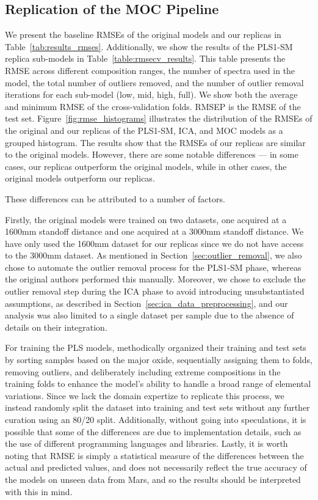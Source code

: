 \subsection{Replication of the MOC Pipeline}\label{sec:replica_moc}
We present the baseline RMSEs of the original models and our replicas in Table~\ref{tab:results_rmses}.
Additionally, we show the results of the PLS1-SM replica sub-models in Table~\ref{table:rmsecv_results}. This table presents the RMSE across different composition ranges, the number of spectra used in the model, the total number of outliers removed, and the number of outlier removal iterations for each sub-model (low, mid, high, full). We show both the average and minimum RMSE of the cross-validation folds. RMSEP is the RMSE of the test set.
Figure~\ref{fig:rmse_histograms} illustrates the distribution of the RMSEs of the original and our replicas of the PLS1-SM, ICA, and MOC models as a grouped histogram.
The results show that the RMSEs of our replicas are similar to the original models.
However, there are some notable differences --- in some cases, our replicas outperform the original models, while in other cases, the original models outperform our replicas.

These differences can be attributed to a number of factors.

Firstly, the original models were trained on two datasets, one acquired at a 1600mm standoff distance and one acquired at a 3000mm standoff distance.
We have only used the 1600mm dataset for our replicas since we do not have access to the 3000mm dataset.
As mentioned in Section~\ref{sec:outlier_removal}, we also chose to automate the outlier removal process for the PLS1-SM phase, whereas the original authors performed this manually.
Moreover, we chose to exclude the outlier removal step during the ICA phase to avoid introducing unsubstantiated assumptions, as described in Section~\ref{sec:ica_data_preprocessing}, and our analysis was also limited to a single dataset per sample due to the absence of details on their integration.

For training the PLS models, \citet{andersonImprovedAccuracyQuantitative2017} methodically organized their training and test sets by sorting samples based on the major oxide, sequentially assigning them to folds, removing outliers, and deliberately including extreme compositions in the training folds to enhance the model's ability to handle a broad range of elemental variations.
Since we lack the domain expertize to replicate this process, we instead randomly split the dataset into training and test sets without any further curation using an 80/20 split.
Additionally, without going into speculations, it is possible that some of the differences are due to implementation details, such as the use of different programming languages and libraries.
Lastly, it is worth noting that RMSE is simply a statistical measure of the differences between the actual and predicted values, and does not necessarily reflect the true accuracy of the models on unseen data from Mars, and so the results should be interpreted with this in mind.

